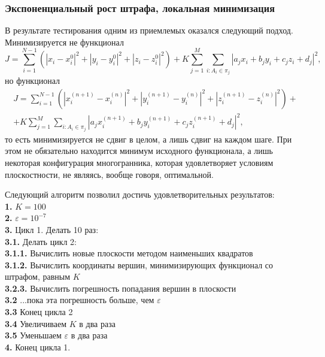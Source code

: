 \documentclass[a4paper,12pt, titlepage]{article}
\begin{document}
\subsubsection{Экспоненциальный рост штрафа, локальная минимизация}
\begin{flushleft}
 В результате тестирования одним из приемлемых оказался следующий подход. Минимизируется не функционал
$$
	J = \sum\limits_{i = 1}^{N - 1}(|x_{i} - x_{i}^{0}|^{2} + |y_{i} - y_{i}^{0}|^{2} 
	+ |z_{i} - z_{i}^{0}|^{2}) + 
	K\sum\limits_{j = 1}^{M}\sum\limits_{i: A_{i} \in \pi_{j}}
	|a_{j}x_{i} + b_{j}y_{i} + c_{j}z_{i} + d_{j}|^{2},
$$ но функционал
$$
  \begin{aligned}
	J = \sum\limits_{i = 1}^{N - 1}(|x_{i}^{(n+1)} - x_{i}^{(n)}|^{2} + |y_{i}^{(n+1)} - y_{i}^{(n)}|^{2} 
	+ |z_{i}^{(n+1)} - z_{i}^{(n)}|^{2}) + \\
	+ K\sum\limits_{j = 1}^{M}\sum\limits_{i: A_{i} \in \pi_{j}}
	|a_{j}x_{i}^{(n+1)} + b_{j}y_{i}^{(n+1)} + c_{j}z_{i}^{(n+1)} + d_{j}|^{2},
  \end{aligned}
$$то есть минимизируется не сдвиг в целом, а лишь сдвиг на каждом шаге. При этом не обязательно находится
минимум исходного функционала, а лишь некоторая конфигурация многогранника, которая удовлетворяет условиям
плоскостности, не являясь, вообще говоря, оптимальной.
\end{flushleft}
\begin{flushleft}
Следующий алгоритм позволил достичь удовлетворительных результатов:\\
	\textbf{1. }$K = 100$\\
	\textbf{2. }$\varepsilon = 10^{-7}$\\
	\textbf{3. }Цикл 1. Делать 10 раз:\\
	\textbf{3.1. }Делать цикл 2: \\
	\textbf{3.1.1. }Вычислить новые плоскости методом наименьших квадратов\\
	\textbf{3.1.2. }Вычислить координаты вершин, минимизирующих функционал со штрафом, равным $K$\\
	\textbf{3.2.3. }Вычислить погрешность попадания вершин в плоскости\\
	\textbf{3.2 }...пока эта погрешность больше, чем $\varepsilon$\\
	\textbf{3.3 }Конец цикла 2\\
	\textbf{3.4 }Увеличиваем $K$ в два раза\\
	\textbf{3.5 }Уменьшаем $\varepsilon$ в два раза\\
	\textbf{4. }Конец цикла 1.\\
\end{flushleft}
\end{document}
